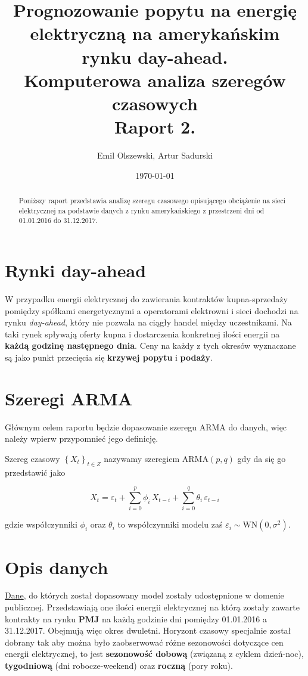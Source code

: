 \documentclass{article}
\author{Emil Olszewski, Artur Sadurski}
\date{\today}
\title{Prognozowanie popytu na energię elektryczną na amerykańskim rynku day-ahead. \\  \large Komputerowa analiza szeregów czasowych \\ \large Raport 2. }
\begin{document}
\maketitle

\begin{abstract}
Poniższy raport przedstawia analizę szeregu czasowego opisującego obciążenie na sieci elektrycznej na podstawie danych z rynku amerykańskiego z przestrzeni dni od 01.01.2016 do 31.12.2017. 
\end{abstract}


\section{Rynki day-ahead} 

W przypadku energii elektrycznej do zawierania kontraktów kupna-sprzedaży pomiędzy spółkami energetycznymi a operatorami elektrowni i sieci dochodzi na rynku \textit{day-ahead}, który nie pozwala na ciągły handel między uczestnikami. Na taki rynek spływają oferty kupna i dostarczenia konkretnej ilości energii na \textbf{każdą godzinę następnego dnia}. Ceny na każdy z tych okresów wyznaczane są jako punkt przecięcia się \textbf{krzywej popytu} i \textbf{podaży}. 


\section{Szeregi ARMA}
Głównym celem raportu będzie dopasowanie szeregu ARMA do danych, więc należy wpierw przypomnieć jego definicję. 

\begin{definition}

Szereg czasowy ${\left\lbrace X_t \right\rbrace}_{t \in Z}$ nazywamy szeregiem $\text{ARMA}(p, q)$ gdy da się go przedstawić jako

$$ X_t = \varepsilon_t + \sum_{i=0}^p \phi_i\,X_{t-i} + \sum_{i=0}^q \theta_i\,\varepsilon_{t-i} $$

gdzie współczynniki $\phi_i$ oraz $\theta_i$ to współczynniki modelu zaś $\varepsilon_i \sim \text{WN}(0, \sigma^2)$. 
\end{definition}


\section{Opis danych}
\href{https://www.kaggle.com/datasets/robikscube/hourly-energy-consumption}{Dane}, do których został dopasowany model zostały udostępnione w domenie publicznej. Przedstawiają one ilości energii elektrycznej na którą zostały zawarte kontrakty na rynku \textbf{PMJ} na każdą godzinie dni pomiędzy 01.01.2016 a 31.12.2017. Obejmują więc okres dwuletni. Horyzont czasowy specjalnie został dobrany tak aby można było zaobserwować różne sezonowości dotyczące cen energii elektrycznej, to jest \textbf{sezonowość dobową} (związaną z cyklem dzień-noc), \textbf{tygodniową} (dni robocze-weekend) oraz \textbf{roczną} (pory roku). 
\end{document}
